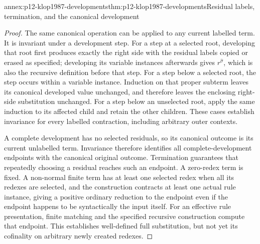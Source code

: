 \begin{annexitem}{annex:p12-klop1987-developments}{thm:p12-klop1987-developments}{Residual labels, termination, and the canonical development}
\begin{proof}
The same canonical operation can be applied to any current labelled term.
It is invariant under a development step. For a step at a selected root,
developing that root first produces exactly the right side with the
residual labels copied or erased as specified; developing its variable
instances afterwards gives \(r^{\widehat\sigma}\), which is also
the recursive definition before that step. For a step below a selected
root, the step occurs within a variable instance. Induction on that
proper subterm leaves its canonical developed value unchanged, and
therefore leaves the enclosing right-side substitution unchanged.
For a step below an unselected root, apply the same induction to its
affected child and retain the other children. These cases establish
invariance for every labelled contraction, including arbitrary outer
contexts.

A complete development has no selected residuals, so its canonical
outcome is its current unlabelled term. Invariance therefore identifies
all complete-development endpoints with the canonical original outcome.
Termination guarantees that repeatedly choosing a residual reaches such
an endpoint. A zero-redex term is fixed. A non-normal finite term has
at least one selected redex when all its redexes are selected, and the
construction contracts at least one actual rule instance, giving a
positive ordinary reduction to the endpoint even if the endpoint happens
to be syntactically the input itself. For an effective rule presentation,
finite matching and the specified recursive construction compute that
endpoint. This establishes well-defined full substitution, but not yet
its cofinality on arbitrary newly created redexes.
\end{proof}
\end{annexitem}
